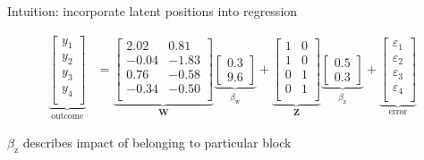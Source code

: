\documentclass{beamer}
\theoremstyle{remark}
\newcommand{\Z}{\bm Z}
\newcommand{\W}{\bm W}
\begin{document}
\begin{frame}{Intuition: incorporate latent positions into regression}

    \begin{align*}
        \underbrace{
            \begin{bmatrix}
                y_1 \\
                y_2 \\
                y_3 \\
                y_4 \\
            \end{bmatrix}
        }_\text{outcome}
         & =
        \underbrace{
            \begin{bmatrix}
                2.02  & 0.81  \\
                -0.04 & -1.83 \\
                0.76  & -0.58 \\
                -0.34 & -0.50 \\
            \end{bmatrix}
        }_{\W}
        \underbrace{
            \begin{bmatrix}
                0.3 \\
                9.6
            \end{bmatrix}
        }_{\beta_\text{w}}
        +
        \underbrace{
            \begin{bmatrix}
                1 & 0 \\
                1 & 0 \\
                0 & 1 \\
                0 & 1 \\
            \end{bmatrix}
        }_{\Z}
        \underbrace{
            \begin{bmatrix}
                0.5 \\
                0.3
            \end{bmatrix}
        }_{\beta_\text{z}}
        +
        \underbrace{
            \begin{bmatrix}
                \varepsilon_1 \\
                \varepsilon_2 \\
                \varepsilon_3 \\
                \varepsilon_4 \\
            \end{bmatrix}
        }_\text{error}
    \end{align*}

    $\beta_\text{z}$ describes impact of belonging to particular block

\end{frame}
\end{document}
